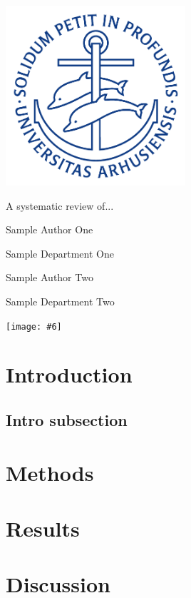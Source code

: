 \documentclass[english,11pt,a4paper,titlepage]{article}
\newcommand{\frontpageWhite}[7]{
	\begin{titlepage}
		\centering
		\includegraphics[width=0.5\textwidth]{img/ausegl.png}\par
		\vspace*{1cm}
		{\fontsize{34}{40}\selectfont\color{sectioncolor}\titlefont #1\par} %
		\vspace{2cm}
		{\Large\headingfont\color{sectioncolor} #2\par} %
		{\large\headingfont\color{sectioncolor} #3\par} %
		\vspace{1cm}
		{\Large\headingfont\color{sectioncolor} #4\par} %
		{\large\headingfont\color{sectioncolor} #5\par} %
		\vspace{1cm}
		\texttt{[image: \#6]} %
		\vfill
		{\Large\headingfont\color{sectioncolor} #7}
	\end{titlepage}	
}
\begin{document}
\setlength{\parindent}{25pt} %


\frontpageWhite{A systematic review of...}{Sample Author One}{Sample Department One}{Sample Author Two}{Sample Department Two}{img/au_blue.png}{}

\begin{abstract}
	\noindent %
	\kant[1]
\end{abstract}


\section{Introduction}
\kant[2]	

	\subsection{Intro subsection}
	\kant[3]

\section{Methods}
\kant[4]

\section{Results}
\kant[5]

\section{Discussion}
\kant[6]

	
\end{document}
